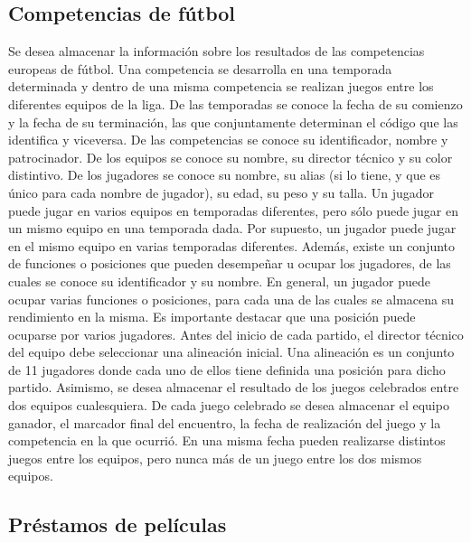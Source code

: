 \subsection{Competencias de f\'utbol}
Se desea almacenar la informaci\'on sobre los resultados de las competencias europeas de f\'utbol.  Una competencia se desarrolla en una temporada determinada y dentro de una misma competencia se realizan juegos entre los diferentes equipos de la liga. De las temporadas se conoce la fecha de su comienzo y la fecha de su terminaci\'on, las que conjuntamente determinan el c\'odigo que las identifica y viceversa. De las competencias se conoce su identificador, nombre y patrocinador. De los equipos se conoce su nombre, su director t\'ecnico y su color distintivo. De los jugadores se conoce su nombre, su alias (si lo tiene, y que es \'unico para cada nombre de jugador), su edad, su peso y su talla. Un jugador puede jugar en varios equipos en temporadas diferentes, pero s\'olo puede jugar en un mismo equipo en una temporada dada. Por supuesto, un jugador puede jugar en el mismo equipo en varias temporadas diferentes. Adem\'as, existe un conjunto de funciones o posiciones que pueden desempe\~nar u ocupar los jugadores, de las cuales se conoce su identificador y su nombre.  En general, un jugador puede ocupar varias funciones o posiciones, para cada una de las cuales se almacena su rendimiento en la misma. Es importante destacar que una posici\'on puede ocuparse por varios jugadores. Antes del inicio de cada partido, el director t\'ecnico del equipo debe seleccionar una alineaci\'on inicial. Una alineaci\'on es un conjunto de 11 jugadores donde cada uno de ellos tiene definida una posici\'on para dicho partido. Asimismo, se desea almacenar el resultado de los juegos celebrados entre dos equipos cualesquiera. De cada juego celebrado se desea almacenar el equipo ganador, el marcador final del encuentro, la fecha de realizaci\'on del juego y la competencia en la que ocurri\'o. En una misma fecha pueden realizarse distintos juegos entre los equipos, pero nunca m\'as de un juego entre los dos mismos equipos.

\subsection{Pr\'estamos de pel\'iculas}

